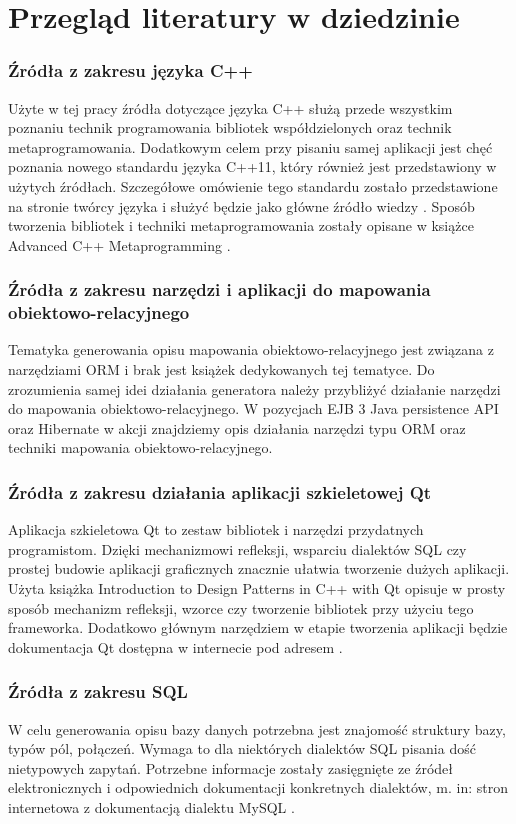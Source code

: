 \documentclass[12pt]{report}
\let\Oldsection\section
\renewcommand{\section}{\FloatBarrier\Oldsection}
\let\Oldsubsubsection\subsubsection
\renewcommand{\subsubsection}{\FloatBarrier\Oldsubsubsection}
\begin{document}
\clearpage

\section{Przegląd literatury w dziedzinie}
\subsubsection{Źródła z zakresu języka C++}
	\indent Użyte w tej pracy źródła dotyczące języka C++ służą przede wszystkim poznaniu technik programowania bibliotek współdzielonych oraz technik metaprogramowania. Dodatkowym celem przy pisaniu samej aplikacji jest chęć poznania nowego standardu języka C++11, który również jest przedstawiony w użytych źródłach. Szczegółowe omówienie tego standardu zostało przedstawione na stronie twórcy języka i służyć będzie jako główne źródło wiedzy \cite{strostrup}.
Sposób tworzenia bibliotek i techniki metaprogramowania zostały opisane w książce Advanced C++ Metaprogramming \cite{c++2}.
\subsubsection{Źródła z zakresu narzędzi i aplikacji do mapowania obiektowo-relacyjnego}
	\indent Tematyka generowania opisu mapowania obiektowo-relacyjnego jest związana z narzędziami ORM i brak jest książek dedykowanych tej tematyce. Do zrozumienia samej idei działania generatora należy przybliżyć działanie narzędzi do mapowania obiektowo-relacyjnego. W pozycjach EJB 3 Java persistence API \cite{ejb} oraz Hibernate w akcji \cite{hibernateInAction}
znajdziemy opis działania narzędzi typu ORM oraz techniki mapowania obiektowo-relacyjnego.
\subsubsection{Źródła z zakresu działania aplikacji szkieletowej Qt}
	\indent Aplikacja szkieletowa Qt to zestaw bibliotek i narzędzi przydatnych programistom. Dzięki mechanizmowi refleksji, wsparciu dialektów SQL czy prostej budowie aplikacji graficznych znacznie ułatwia tworzenie dużych aplikacji. Użyta książka Introduction to Design Patterns in C++ with Qt \cite{c++patterns}
opisuje w prosty sposób mechanizm refleksji, wzorce czy tworzenie bibliotek przy użyciu tego frameworka.
Dodatkowo głównym narzędziem w etapie tworzenia aplikacji będzie dokumentacja Qt dostępna w internecie pod adresem \cite{qtframework}.
\subsubsection{Źródła z zakresu SQL}
	\indent W celu generowania opisu bazy danych potrzebna jest znajomość struktury bazy, typów pól, połączeń. Wymaga to dla niektórych dialektów SQL pisania dość nietypowych zapytań. Potrzebne informacje zostały zasięgnięte ze źródeł elektronicznych i odpowiednich dokumentacji konkretnych dialektów, m. in: stron internetowa z dokumentacją dialektu MySQL \cite{mysqlweb}.
\end{document}
